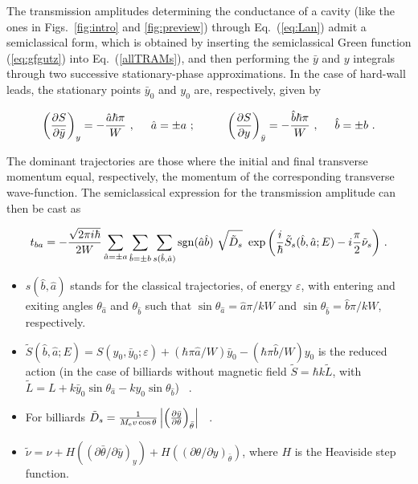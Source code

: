 \documentclass[a4paper,10pt]{article}
\newcommand{\nin}{\noindent}
\def\Me{M_{\rm e}}
\newcommand{\be}{\begin{equation}}
\newcommand{\ee}{\end{equation}}
\begin{document}
The transmission amplitudes determining the conductance of a cavity 
(like the ones in Figs.~\ref{fig:intro} and \ref{fig:preview}) through
Eq.~(\ref{eq:Lan}) admit a semiclassical form, which is obtained by inserting the semiclassical Green function (\ref{eq:gfgutz}) into Eq.~(\ref{allTRAMs}), and then performing the ${\bar y}$ and $y$ integrals through two successive stationary-phase approximations. In the case of hard-wall leads, the stationary points ${\bar y}_0$ and $y_0$ are, respectively, given by

\be
\left(\frac{\partial S}{\partial {\bar y}} \right)_{y} = 
- \frac{\hat{a} \hbar \pi}{W} \ , \hspace{0.5cm} \hat{a}=\pm a \ ;
 \hspace{1cm}
\left(\frac{\partial S}{\partial y} \right)_{\bar y} = 
- \frac{\hat{b} \hbar \pi}{W} \ , \hspace{0.5cm} \hat{b}=\pm b \ .
\label{eq:stphcon}
\ee

\nin The dominant trajectories are those where the initial and final transverse momentum equal, respectively, the momentum of the corresponding transverse wave-function. The semiclassical expression for the transmission
amplitude can then be cast as \cite{Jal90}

\be
t_{ba}=-\frac{\sqrt{2\pi i\hbar}}{2W} \sum_{\hat{a}=\pm a} \sum_{\hat{b}=\pm b}
\sum_{s(\hat{b},\hat{a})} {\rm sgn}(\hat{a}\hat{b}) \ \sqrt
{\tilde{D}_{s}} \ \exp{\left(\frac{i}{\hbar}\tilde{S}_{s}(\hat{b},\hat{a};E)
-i \frac{\pi}{2}{\tilde\nu}_{s}\right)} \ .
\label{eq:semiclass}
\ee

\begin{itemize}

\item $s(\hat{b},\hat{a})$ stands for the classical trajectories, of energy $\varepsilon$, with entering and exiting angles $\theta_{\hat{a}}$ and $\theta_{\hat{b}}$ such that $\sin\theta_{\hat{a}}\!=\!
\hat{a}\pi/ kW$ and $\sin\theta_{\hat{b}} = \hat{b}\pi/ kW$, respectively. 
 
\item $\tilde{S}(\hat{b},\hat{a};E)=S(y_{0},{\bar y}_{0};\varepsilon)+
(\hbar\pi\hat{a}/W) {\bar y}_{0} - (\hbar\pi\hat{b}/W) y_{0}$ is the reduced action (in the case of billiards without magnetic field 
$\tilde{S}=\hbar k \tilde{L}$, with 
$\tilde{L}=L+k {\bar y}_{0} \sin\theta_{\hat{a}} -k y_{0} \sin\theta_{\hat{b}}$) \ .
  
\item For billiards $\tilde{D}_{s}=\frac{1}{\Me v\cos{\theta}} \left|
\left(\frac{\partial {\bar y}}{\partial \theta}\right)_{\bar \theta}\right|$ \ . 

\item $\tilde{\nu} = \nu + 
H((\partial {\bar \theta}/\partial {\bar y})_{y}) +
H\left(\left(\partial \theta/\partial y\right)_{\bar \theta}\right)$, where $H$ is the Heaviside step function. 

\end{itemize}
\end{document}
